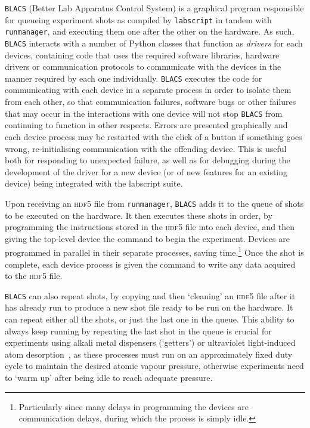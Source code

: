 \texttt{BLACS} (Better Lab Apparatus Control System) is a graphical program responsible for queueing experiment shots as compiled by \texttt{labscript} in tandem with \texttt{runmanager}, and executing them one after the other on the hardware. As such, \texttt{BLACS} interacts with a number of Python classes that function as \emph{drivers} for each devices, containing code that uses the required software libraries, hardware drivers or communication protocols to communicate with the devices in the manner required by each one individually. \texttt{BLACS} executes the code for communicating with each device in a separate process in order to isolate them from each other, so that communication failures, software bugs or other failures that may occur in the interactions with one device will not stop \texttt{BLACS} from continuing to function in other respects. Errors are presented graphically and each device process may be restarted with the click of a button if something goes wrong, re-initialising communication with the offending device. This is useful both for responding to unexpected failure, as well as for debugging during the development of the driver for a new device (or of new features for an existing device) being integrated with the labscript suite.

Upon receiving an \textsc{hdf5} file from \texttt{runmanager}, \texttt{BLACS} adds it to the queue of shots to be executed on the hardware. It then executes these shots in order, by programming the instructions stored in the \textsc{hdf5} file into each device, and then giving the top-level device the command to begin the experiment. Devices are programmed in parallel in their separate processes, saving time.\footnote{Particularly since many delays in programming the devices are communication delays, during which the process is simply idle.} Once the shot is complete, each device process is given the command to write any data acquired to the \textsc{hdf5} file.

\texttt{BLACS} can also repeat shots, by copying and then `cleaning' an \textsc{hdf5} file after it has already run to produce a new shot file ready to be run on the hardware. It can repeat either all the shots, or just the last one in the queue. This ability to always keep running by repeating the last shot in the queue is crucial for experiments using alkali metal dispensers (`getters') or ultraviolet light-induced atom desorption~\cite{klempt_ultraviolet_2006}, as these processes must run on an approximately fixed duty cycle to maintain the desired atomic vapour pressure, otherwise experiments need to `warm up' after being idle to reach adequate pressure.


